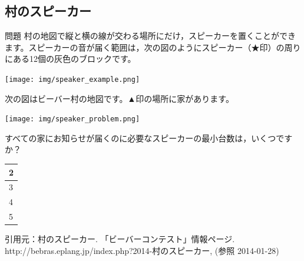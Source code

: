 \documentclass[a4paper]{jarticle}
\begin{document}
\begin{multicols}{2}
\subsection{村のスピーカー}
\begin{itembox}[l]{問題}
村の地図で縦と横の線が交わる場所にだけ，スピーカーを置くことができます。スピーカーの音が届く範囲は，次の図のようにスピーカー（★印）の周りにある12個の灰色のブロックです。
\begin{center}
\texttt{[image: img/speaker\_example.png]}
\end{center}
次の図はビーバー村の地図です。▲印の場所に家があります。
\begin{center}
\texttt{[image: img/speaker\_problem.png]}
\end{center}
すべての家にお知らせが届くのに必要なスピーカーの最小台数は，いくつですか？
\begin{center}
\begin{tabular}{|p{2cm}|} \hline
2\\ \hline
3\\ \hline
4\\ \hline
5\\ \hline
\end{tabular}
\end{center}
{ \scriptsize 引用元：村のスピーカー. 「ビーバーコンテスト」情報ページ. http://bebras.eplang.jp/index.php?2014-村のスピーカー, (参照 2014-01-28)}
\end{itembox}


\end{multicols}
\end{document}
